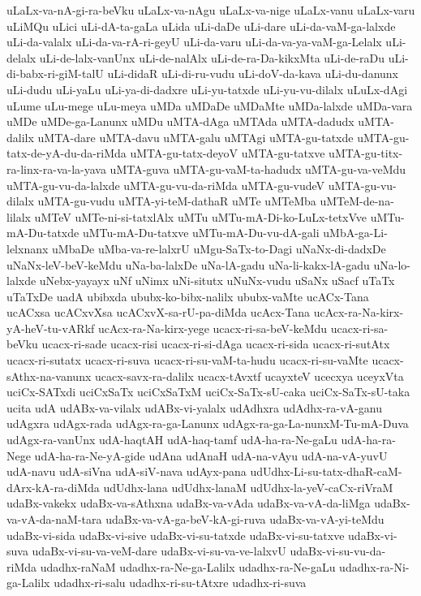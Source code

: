 {uLaLx-va-nA-gi-ra-beVku
uLaLx-va-nAgu
uLaLx-va-nige
uLaLx-vanu
uLaLx-varu
uLiMQu
uLici
uLi-dA-ta-gaLa
uLida
uLi-daDe
uLi-dare
uLi-da-vaM-ga-lalxde
uLi-da-valalx
uLi-da-va-rA-ri-geyU
uLi-da-varu
uLi-da-va-ya-vaM-ga-Lelalx
uLi-delalx
uLi-de-lalx-vanUnx
uLi-de-nalAlx
uLi-de-ra-Da-kikxMta
uLi-de-raDu
uLi-di-babx-ri-giM-talU
uLi-didaR
uLi-di-ru-vudu
uLi-doV-da-kava
uLi-du-danunx
uLi-dudu
uLi-yaLu
uLi-ya-di-dadxre
uLi-yu-tatxde
uLi-yu-vu-dilalx
uLuLx-dAgi
uLume
uLu-mege
uLu-meya
uMDa
uMDaDe
uMDaMte
uMDa-lalxde
uMDa-vara
uMDe
uMDe-ga-Lanunx
uMDu
uMTA-dAga
uMTAda
uMTA-dadudx
uMTA-dalilx
uMTA-dare
uMTA-davu
uMTA-galu
uMTAgi
uMTA-gu-tatxde
uMTA-gu-tatx-de-yA-du-da-riMda
uMTA-gu-tatx-deyoV
uMTA-gu-tatxve
uMTA-gu-titx-ra-linx-ra-va-la-yava
uMTA-guva
uMTA-gu-vaM-ta-hadudx
uMTA-gu-va-veMdu
uMTA-gu-vu-da-lalxde
uMTA-gu-vu-da-riMda
uMTA-gu-vudeV
uMTA-gu-vu-dilalx
uMTA-gu-vudu
uMTA-yi-teM-dathaR
uMTe
uMTeMba
uMTeM-de-na-lilalx
uMTeV
uMTe-ni-si-tatxlAlx
uMTu
uMTu-mA-Di-ko-LuLx-tetxVve
uMTu-mA-Du-tatxde
uMTu-mA-Du-tatxve
uMTu-mA-Du-vu-dA-gali
uMbA-ga-Li-lelxnanx
uMbaDe
uMba-va-re-lalxrU
uMgu-SaTx-to-Dagi
uNaNx-di-dadxDe
uNaNx-leV-beV-keMdu
uNa-ba-lalxDe
uNa-lA-gadu
uNa-li-kakx-lA-gadu
uNa-lo-lalxde
uNebx-yayayx
uNf
uNimx
uNi-situtx
uNuNx-vudu
uSaNx
uSacf
uTaTx
uTaTxDe
uadA
ubibxda
ububx-ko-bibx-nalilx
ububx-vaMte
ucACx-Tana
ucACxsa
ucACxvXsa
ucACxvX-sa-rU-pa-diMda
ucAcx-Tana
ucAcx-ra-Na-kirx-yA-heV-tu-vARkf
ucAcx-ra-Na-kirx-yege
ucacx-ri-sa-beV-keMdu
ucacx-ri-sa-beVku
ucacx-ri-sade
ucacx-risi
ucacx-ri-si-dAga
ucacx-ri-sida
ucacx-ri-sutAtx
ucacx-ri-sutatx
ucacx-ri-suva
ucacx-ri-su-vaM-ta-hudu
ucacx-ri-su-vaMte
ucacx-sAthx-na-vanunx
ucacx-savx-ra-dalilx
ucacx-tAvxtf
ucayxteV
ucecxya
uceyxVta
uciCx-SATxdi
uciCxSaTx
uciCxSaTxM
uciCx-SaTx-sU-caka
uciCx-SaTx-sU-taka
ucita
udA
udABx-va-vilalx
udABx-vi-yalalx
udAdhxra
udAdhx-ra-vA-ganu
udAgxra
udAgx-rada
udAgx-ra-ga-Lanunx
udAgx-ra-ga-La-nunxM-Tu-mA-Duva
udAgx-ra-vanUnx
udA-haqtAH
udA-haq-tamf
udA-ha-ra-Ne-gaLu
udA-ha-ra-Nege
udA-ha-ra-Ne-yA-gide
udAna
udAnaH
udA-na-vAyu
udA-na-vA-yuvU
udA-navu
udA-siVna
udA-siV-nava
udAyx-pana
udUdhx-Li-su-tatx-dhaR-caM-dArx-kA-ra-diMda
udUdhx-lana
udUdhx-lanaM
udUdhx-la-yeV-caCx-riVraM
udaBx-vakekx
udaBx-va-sAthxna
udaBx-va-vAda
udaBx-va-vA-da-liMga
udaBx-va-vA-da-naM-tara
udaBx-va-vA-ga-beV-kA-gi-ruva
udaBx-va-vA-yi-teMdu
udaBx-vi-sida
udaBx-vi-sive
udaBx-vi-su-tatxde
udaBx-vi-su-tatxve
udaBx-vi-suva
udaBx-vi-su-va-veM-dare
udaBx-vi-su-va-ve-lalxvU
udaBx-vi-su-vu-da-riMda
udadhx-raNaM
udadhx-ra-Ne-ga-Lalilx
udadhx-ra-Ne-gaLu
udadhx-ra-Ni-ga-Lalilx
udadhx-ri-salu
udadhx-ri-su-tAtxre
udadhx-ri-suva
}
